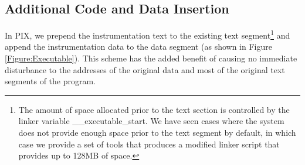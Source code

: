 \subsection{Additional Code and Data Insertion}

In PIX, we prepend the instrumentation text to the existing text
segment\footnote{The amount of space allocated prior to the text section is
controlled by the linker variable \_\_executable\_start. We have seen cases
where the system does not provide enough space prior to the text segment by
default, in which case we provide a set of tools that produces a modified linker
script that provides up to 128MB of space.} and append the instrumentation data to the
data segment (as shown in Figure \ref{Figure:Executable}). This
scheme has the added benefit of causing no immediate disturbance to the
addresses of the original data and most of the original text segments of the program.

